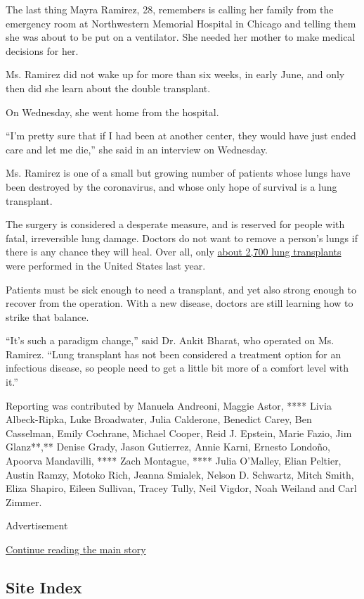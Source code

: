 The last thing Mayra Ramirez, 28, remembers is calling her family from
the emergency room at Northwestern Memorial Hospital in Chicago and
telling them she was about to be put on a ventilator. She needed her
mother to make medical decisions for her.

Ms. Ramirez did not wake up for more than six weeks, in early June, and
only then did she learn about the double transplant.

On Wednesday, she went home from the hospital.

``I'm pretty sure that if I had been at another center, they would have
just ended care and let me die,'' she said in an interview on Wednesday.

Ms. Ramirez is one of a small but growing number of patients whose lungs
have been destroyed by the coronavirus, and whose only hope of survival
is a lung transplant.

The surgery is considered a desperate measure, and is reserved for
people with fatal, irreversible lung damage. Doctors do not want to
remove a person's lungs if there is any chance they will heal. Over all,
only \href{https://unos.org/data/transplant-trends/}{about 2,700 lung
transplants} were performed in the United States last year.

Patients must be sick enough to need a transplant, and yet also strong
enough to recover from the operation. With a new disease, doctors are
still learning how to strike that balance.

``It's such a paradigm change,'' said Dr. Ankit Bharat, who operated on
Ms. Ramirez. ``Lung transplant has not been considered a treatment
option for an infectious disease, so people need to get a little bit
more of a comfort level with it.''

Reporting was contributed by Manuela Andreoni, Maggie Astor, **** Livia
Albeck-Ripka, Luke Broadwater, Julia Calderone, Benedict Carey, Ben
Casselman, Emily Cochrane, Michael Cooper, Reid J. Epstein, Marie Fazio,
Jim Glanz**,** Denise Grady, Jason Gutierrez, Annie Karni, Ernesto
Londoño, Apoorva Mandavilli, **** Zach Montague, **** Julia O'Malley,
Elian Peltier, Austin Ramzy, Motoko Rich, Jeanna Smialek, Nelson D.
Schwartz, Mitch Smith, Eliza Shapiro, Eileen Sullivan, Tracey Tully,
Neil Vigdor, Noah Weiland and Carl Zimmer.

Advertisement

\protect\hyperlink{after-bottom}{Continue reading the main story}

\hypertarget{site-index}{%
\subsection{Site Index}\label{site-index}}

